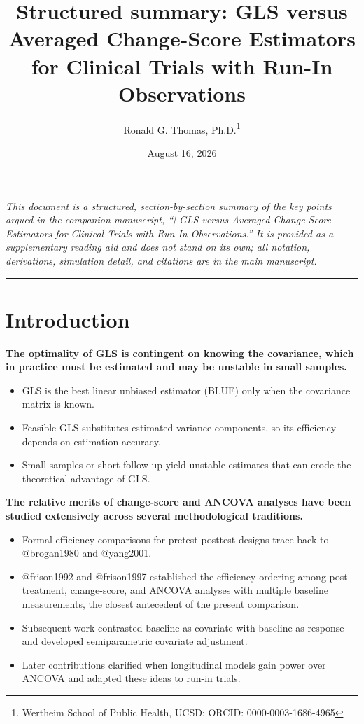 \documentclass[
  11pt,
]{article}
\title{Structured summary: \textbar{} GLS versus Averaged Change-Score Estimators for Clinical Trials with Run-In Observations}
\author{Ronald G. Thomas, Ph.D.\thanks{Wertheim School of Public Health, UCSD; ORCID: 0000-0003-1686-4965}}
\date{August 16, 2026}
\begin{document}
\maketitle

{
\setcounter{tocdepth}{2}
\tableofcontents
}
\emph{This document is a structured, section-by-section summary of the key points argued in the companion manuscript, ``| GLS versus Averaged Change-Score Estimators for Clinical Trials with Run-In Observations.'' It is provided as a supplementary reading aid and does not stand on its own; all notation, derivations, simulation detail, and citations are in the main manuscript.}

\bigskip\noindent

\rule{\textwidth}{0.4pt}\bigskip

\section{Introduction}\label{introduction}

\textbf{The optimality of GLS is contingent on knowing the covariance, which in practice must be estimated and may be unstable in small samples.}

\begin{itemize}\setlength{\itemsep}{2pt}\setlength{\parskip}{0pt}
\item GLS is the best linear unbiased estimator (BLUE) only when the covariance matrix is known.
\item Feasible GLS substitutes estimated variance components, so its efficiency depends on estimation accuracy.
\item Small samples or short follow-up yield unstable estimates that can erode the theoretical advantage of GLS.
\end{itemize}

\textbf{The relative merits of change-score and ANCOVA analyses have been studied extensively across several methodological traditions.}

\begin{itemize}\setlength{\itemsep}{2pt}\setlength{\parskip}{0pt}
\item Formal efficiency comparisons for pretest-posttest designs trace back to @brogan1980 and @yang2001.
\item @frison1992 and @frison1997 established the efficiency ordering among post-treatment, change-score, and ANCOVA analyses with multiple baseline measurements, the closest antecedent of the present comparison.
\item Subsequent work contrasted baseline-as-covariate with baseline-as-response and developed semiparametric covariate adjustment.
\item Later contributions clarified when longitudinal models gain power over ANCOVA and adapted these ideas to run-in trials.
\end{itemize}
\end{document}
